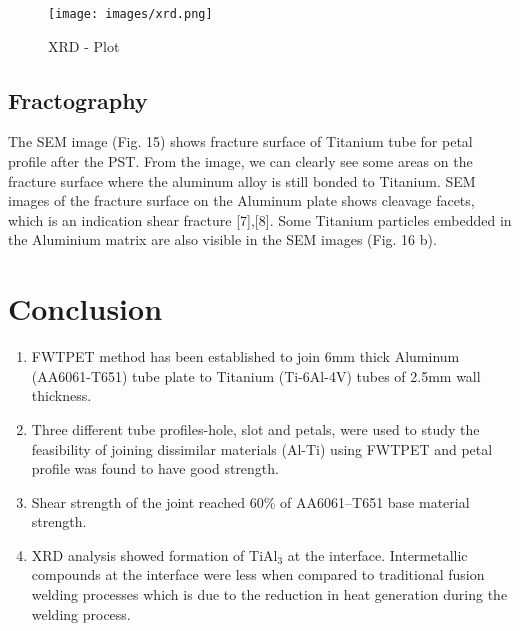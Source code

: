 \documentclass[3p]{elsarticle}
\begin{document}
\begin{figure}[H]
\centering
\texttt{[image: images/xrd.png]}
\caption{XRD - Plot}
\label{fig:xrd-plot}
\end{figure}

\subsection{Fractography}
\label{subsec:Fractography}
The SEM image (Fig. 15) shows fracture surface of Titanium tube for petal profile after the PST. From the image, we can clearly see some areas on the fracture surface where the aluminum alloy is still bonded to Titanium. SEM images of the fracture surface on the Aluminum plate shows cleavage facets, which is an indication shear fracture [7],[8]. Some Titanium particles embedded in the Aluminium matrix are also visible in
the SEM images (Fig. 16 b).

\section{Conclusion}
\label{sec:Conclusion}
\begin{enumerate}[1.]
\item FWTPET method has been established to join 6mm thick Aluminum (AA6061-T651) tube plate to Titanium (Ti-6Al-4V) tubes of 2.5mm wall thickness.
\item Three different tube profiles-hole, slot and petals, were used to study the feasibility of joining dissimilar materials (Al-Ti) using FWTPET and petal profile was found to have good strength.
\item Shear strength of the joint reached 60\% of AA6061–T651 base material strength.
\item XRD analysis showed formation of TiAl$_{3}$ at the interface. Intermetallic compounds at the interface were less when compared to traditional fusion welding processes which is due to the reduction in heat generation during the welding process.
\end{enumerate}
\end{document}
